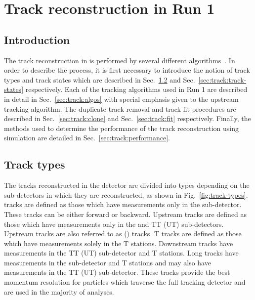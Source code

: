 \section{Track reconstruction in Run 1}
\label{sec:track}

\subsection{Introduction}
\label{sec:track:introduction}

The track reconstruction in \lhcb is performed by several different algorithms~\cite{tracking}. In order to describe the process, it is first necessary to introduce the notion of track types and track states which are described in Sec.~\ref{sec:track:track-types} and Sec.~\ref{sec:track:track-states} respectively. Each of the tracking algorithms used in Run 1 are described in detail in Sec.~\ref{sec:track:algos} with special emphasis given to the upstream tracking algorithm. The duplicate track removal and track fit procedures are described in Sec.~\ref{sec:track:clone} and Sec.~\ref{sec:track:fit} respectively. Finally, the methods used to determine the performance of the track reconstruction using simulation are detailed in Sec.~\ref{sec:track:performance}.

\subsection{Track types}
\label{sec:track:track-types}

The tracks reconstructed in the \lhcb detector are divided into types depending on the sub-detectors in which they are reconstructed, as shown in Fig.~\ref{fig:track-types}. \velo tracks are defined as those which have measurements only in the \velo sub-detector. These tracks can be either forward or backward. Upstream tracks are defined as those which have measurements only in the \velo and TT (UT) sub-detectors. Upstream tracks are also referred to as \velott(\velout) tracks. T tracks are defined as those which have measurements solely in the T stations. Downstream tracks have measurements in the TT (UT) sub-detector and T stations. Long tracks have measurements in the \velo sub-detector and T stations and may also have measurements in the TT (UT) sub-detector. These tracks provide the best momentum resolution for particles which traverse the full tracking detector and are used in the majority of \lhcb analyses.

